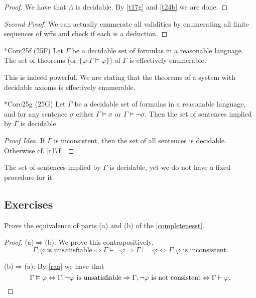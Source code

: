 \begin{proof}
  We have that $\Lambda$ is decidable. By \ref{t17g} and \ref{t24b} we are done.
\end{proof}

\begin{proof}[Second Proof]
  We can actually enumerate all validities by enumerating all finite sequences of wffs and check if each is a deduction.
\end{proof}

\begin{reference}{*Cor}{c25f}
  (25F) Let $\Gamma$ be a decidable set of formulas in a reasonable language. The set of theorems (or $\{\varphi|\Gamma\vDash \varphi\}$) of $\Gamma$ is effectively enumerable.
\end{reference}

This is indeed powerful. We are stating that the theorems of a system with decidable axioms is effectively enumerable.

\begin{reference}{*Cor}{c25g}
  (25G) Let $\Gamma$ be a decidable set of formulas in a reasonable language, and for any sentence $\sigma$ either $\Gamma\vDash \sigma$ or $\Gamma\vDash\neg \sigma$. Then the set of sentences implied by $\Gamma$ is decidable.
\end{reference}

\begin{proof}[Proof Idea]
  If $\Gamma$ is inconsistent, then the set of all sentences is decidable. Otherwise cf. \ref{t17f}.
\end{proof}

The set of sentences implied by $\Gamma$ is decidable, yet we do not have a fixed procedure for it.


\subsection*{Exercises}

\setcounter{exercise}{1}

\begin{exercise}
  Prove the equivalence of parts (a) and (b) of the \ref{completenesst}.
\end{exercise}

\begin{proof}
  (a)$\Rightarrow$(b): We prove this contrapositively.
  \[
    \Gamma;\varphi\text{ is unsatisfiable}\Leftrightarrow\Gamma\vDash\neg \varphi\Rightarrow \Gamma\vdash \neg\varphi \Leftrightarrow \Gamma;\varphi\text{ is inconsistent}.
  \]

  (b)$\Rightarrow$(a): By \ref{raa} we have that
  \[
    \Gamma\vDash \varphi\Leftrightarrow \Gamma;\neg \varphi\text{ is unsatisfiable}\Rightarrow \Gamma;\neg \varphi\text{ is not consistent}\Leftrightarrow \Gamma\vdash \varphi.\qedhere
  \]
\end{proof}


